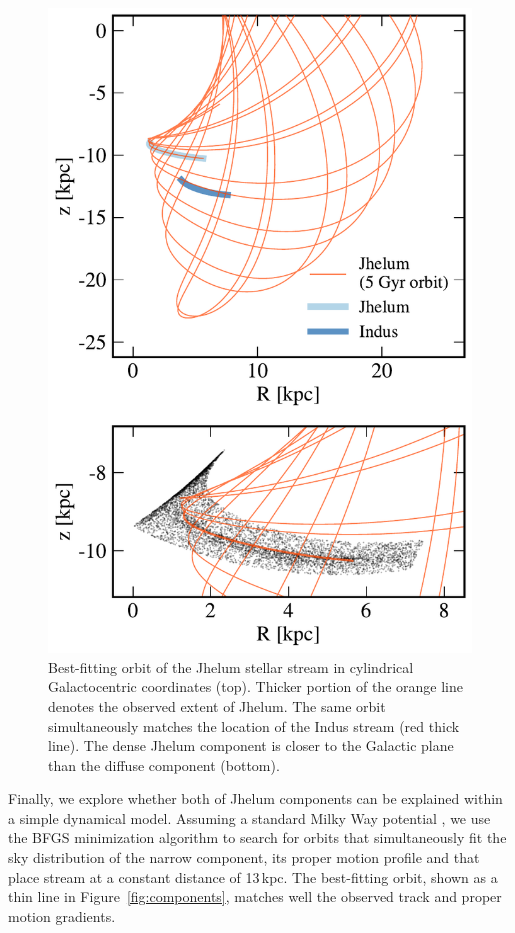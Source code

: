 \documentclass[twocolumn]{aastex62}
\begin{document}
\begin{figure}
\begin{center}
\includegraphics[width=\columnwidth]{orbit_cyl.pdf}
\end{center}
\caption{
Best-fitting orbit of the Jhelum stellar stream in cylindrical Galactocentric coordinates (top).
Thicker portion of the orange line denotes the observed extent of Jhelum.
The same orbit simultaneously matches the location of the Indus stream (red thick line).
The dense Jhelum component is closer to the Galactic plane than the diffuse component (bottom).
}
\label{fig:galactocentric}
\end{figure}

Finally, we explore whether both of Jhelum components can be explained within a simple dynamical model.
Assuming a standard Milky Way potential \citep{gala}, we use the BFGS minimization algorithm to search for orbits that simultaneously fit the sky distribution of the narrow component, its proper motion profile and that place stream at a constant distance of 13\,kpc.
The best-fitting orbit, shown as a thin line in Figure~\ref{fig:components}, matches well the observed track and proper motion gradients.
\end{document}
